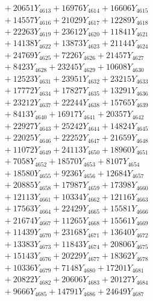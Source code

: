 \documentclass[a4paper,10pt]{article}
\begin{document}
{\begin{align}
&\;  + 20651 Y_{4613} + 16976 Y_{4614} + 16606 Y_{4615} \\[0.3ex]
&\;  + 14557 Y_{4616} + 21029 Y_{4617} + 12289 Y_{4618} \\[0.5ex]\allowbreak
&\;  + 22263 Y_{4619} + 23612 Y_{4620} + 11841 Y_{4621} \\[0.3ex]
&\;  + 14138 Y_{4622} + 13873 Y_{4623} + 21144 Y_{4624} \\[0.3ex]
&\;  + 24769 Y_{4625} + 7226 Y_{4626} + 21457 Y_{4627} \\[0.3ex]
&\;  + 8423 Y_{4628} + 23245 Y_{4629} + 10608 Y_{4630} \\[0.3ex]
&\;  + 12523 Y_{4631} + 23951 Y_{4632} + 23215 Y_{4633} \\[0.3ex]
&\;  + 17772 Y_{4634} + 17827 Y_{4635} + 13291 Y_{4636} \\[0.3ex]
&\;  + 23212 Y_{4637} + 22244 Y_{4638} + 15765 Y_{4639} \\[0.3ex]
&\;  + 8413 Y_{4640} + 16917 Y_{4641} + 20357 Y_{4642} \\[0.3ex]
&\;  + 22927 Y_{4643} + 25242 Y_{4644} + 14824 Y_{4645} \\[0.3ex]
&\;  + 22025 Y_{4646} + 22252 Y_{4647} + 21659 Y_{4648} \\[0.5ex]\allowbreak
&\;  + 11072 Y_{4649} + 24113 Y_{4650} + 18960 Y_{4651} \\[0.3ex]
&\;  + 7058 Y_{4652} + 18570 Y_{4653} + 8107 Y_{4654} \\[0.3ex]
&\;  + 18580 Y_{4655} + 9236 Y_{4656} + 12684 Y_{4657} \\[0.3ex]
&\;  + 20885 Y_{4658} + 17987 Y_{4659} + 17398 Y_{4660} \\[0.3ex]
&\;  + 12113 Y_{4661} + 10334 Y_{4662} + 12116 Y_{4663} \\[0.3ex]
&\;  + 17563 Y_{4664} + 22429 Y_{4665} + 15581 Y_{4666} \\[0.3ex]
&\;  + 21674 Y_{4667} + 11265 Y_{4668} + 15561 Y_{4669} \\[0.3ex]
&\;  + 11439 Y_{4670} + 23168 Y_{4671} + 13640 Y_{4672} \\[0.3ex]
&\;  + 13383 Y_{4673} + 11843 Y_{4674} + 20806 Y_{4675} \\[0.3ex]
&\;  + 15143 Y_{4676} + 20229 Y_{4677} + 18362 Y_{4678} \\[0.5ex]\allowbreak
&\;  + 10336 Y_{4679} + 7148 Y_{4680} + 17201 Y_{4681} \\[0.3ex]
&\;  + 20822 Y_{4682} + 20606 Y_{4683} + 20127 Y_{4684} \\[0.3ex]
&\;  + 9666 Y_{4685} + 14791 Y_{4686} + 24649 Y_{4687} \\[0.3ex]

\end{align}}
\end{document}
